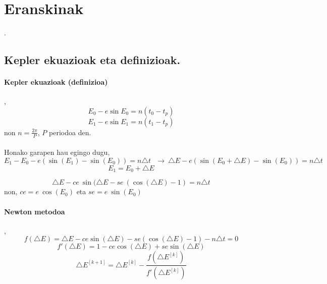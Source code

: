 \section{Eranskinak}.

\subsection{Kepler ekuazioak eta definizioak.}

\paragraph*{\textbf{Kepler ekuazioak (definizioa)}},
\begin{equation*}
E_0-e\sin E_0=n (t_0-t_p)
\end{equation*}
\begin{equation*}
E_1-e\sin E_1=n (t_1-t_p)
\end{equation*}
non $n=\frac{2\pi}{P}$, $P$ periodoa den.

\paragraph*{} Honako garapen hau egingo dugu,
\begin{equation*}
E_1-E_0-e(\sin(E_1)-\sin(E_0))=n \triangle t \ \ \ \longrightarrow \ \triangle E - e(\sin(E_0+\triangle E)-\sin(E_0))=n \triangle t
\end{equation*}
\begin{equation*}
E_1=E_0+\triangle E  
\end{equation*}

\begin{equation*}
\triangle E - ce \ \sin(\triangle E- se \ (\cos(\triangle E)-1)=n \triangle t
\end{equation*}
non, $ce=e \ \cos(E_0)$ eta $se=e \ \sin(E_0)$

\paragraph*{\textbf{Newton metodoa}},
\begin{equation*}
f(\triangle E)=\triangle E - ce \sin(\triangle E)- se (\cos(\triangle E)-1)-n \triangle t=0
\end{equation*}
\begin{equation*}
f'(\triangle E)=1-ce \cos(\triangle E)+ se \sin(\triangle E)
\end{equation*}
\begin{equation}
\triangle E^{[k+1]}=\triangle E^{[k]}- \frac{f(\triangle E^{[k]})}{f'(\triangle E^{[k]})}
\end{equation}


